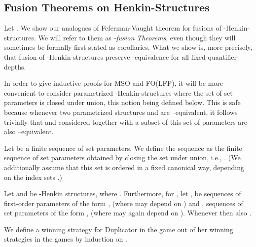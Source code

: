 \documentclass{LMCS}
\newcommand{\mso}{\textsf{MSO}\xspace}
\newcommand{\folfp}{\textsf{FO(LFP)}\xspace}
\begin{document}
\subsection{Fusion Theorems on Henkin-Structures}
\label{apc}


Let . We show our analogues of Feferman-Vaught theorem for fusions of -Henkin-structures. We will refer to them as \emph{-fusion Theorems}, even though they will sometimes be formally first stated as corollaries. What we show is, more precisely, that fusion of -Henkin-structures preserve -equivalence for all fixed quantifier-depths.

In order to give inductive proofs for \mso and \folfp, it will be more convenient to consider parametrized -Henkin-structures where the set of set parameters is closed under union, this notion being defined below. This is safe because whenever two parametrized structures  and  are --equivalent, it follows trivially that  and  considered together with a subset of this set of parameters are also --equivalent.


\begin{defi}
Let  be a finite sequence of set parameters. We
define the sequence  as the finite sequence of set
parameters obtained by closing the set 
under union, i.e., . (We additionally assume that
this set is ordered in a fixed canonical way, depending on the
index sets .)
\end{defi}


\begin{thm}[Fusion Theorem for \mso]
Let  and  be -Henkin
structures, where . Furthermore, for , 
let ,  be sequences of first-order
parameters of the form ,
 (where  may depend on )
and 
,  sequences of set parameters of
the form , 
(where  may again depend on ).
Whenever  then also
.
\label{msofusion}
\end{thm}


\proof
We define a winning strategy for Duplicator in the game
 out of her winning strategies in
the games  by induction on .
\end{document}
